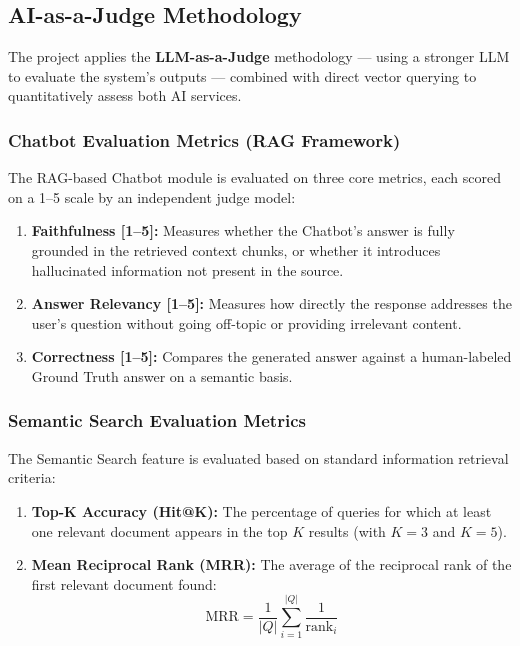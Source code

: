 \subsection{AI-as-a-Judge Methodology}

The project applies the \textbf{LLM-as-a-Judge} methodology — using a stronger LLM to evaluate the system's outputs — combined with direct vector querying to quantitatively assess both AI services.

\subsubsection{Chatbot Evaluation Metrics (RAG Framework)}

The RAG-based Chatbot module is evaluated on three core metrics, each scored on a 1--5 scale by an independent judge model:

\begin{enumerate}
    \item \textbf{Faithfulness [1--5]:} Measures whether the Chatbot's answer is fully grounded in the retrieved context chunks, or whether it introduces hallucinated information not present in the source.
    \item \textbf{Answer Relevancy [1--5]:} Measures how directly the response addresses the user's question without going off-topic or providing irrelevant content.
    \item \textbf{Correctness [1--5]:} Compares the generated answer against a human-labeled Ground Truth answer on a semantic basis.
\end{enumerate}

\subsubsection{Semantic Search Evaluation Metrics}

The Semantic Search feature is evaluated based on standard information retrieval criteria:

\begin{enumerate}
    \item \textbf{Top-K Accuracy (Hit@K):} The percentage of queries for which at least one relevant document appears in the top $K$ results (with $K=3$ and $K=5$).
    \item \textbf{Mean Reciprocal Rank (MRR):} The average of the reciprocal rank of the first relevant document found:
    \begin{equation}
    \text{MRR} = \frac{1}{|Q|} \sum_{i=1}^{|Q|} \frac{1}{\text{rank}_i}
    \end{equation}
\end{enumerate}

